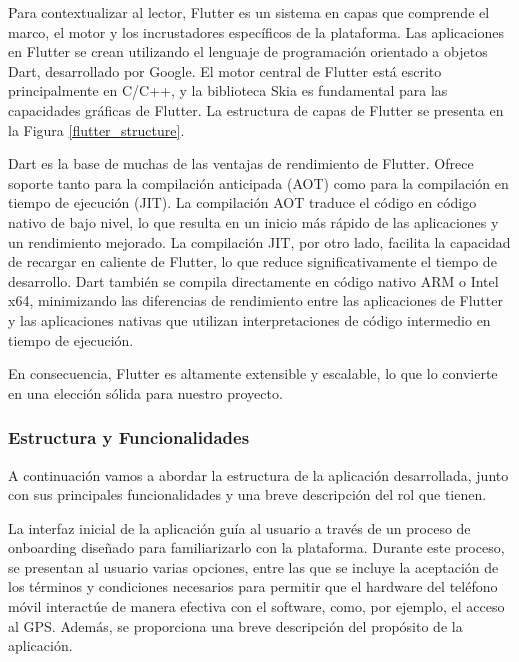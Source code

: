 Para contextualizar al lector, Flutter es un sistema en capas que comprende el marco, el motor y los incrustadores específicos de la plataforma. Las aplicaciones en Flutter se crean utilizando el lenguaje de programación orientado a objetos Dart, desarrollado por Google. El motor central de Flutter está escrito principalmente en C/C++, y la biblioteca Skia es fundamental para las capacidades gráficas de Flutter. La estructura de capas de Flutter se presenta en la Figura \ref{flutter_structure}.


Dart es la base de muchas de las ventajas de rendimiento de Flutter. Ofrece soporte tanto para la compilación anticipada (AOT) como para la compilación en tiempo de ejecución (JIT). La compilación AOT traduce el código en código nativo de bajo nivel, lo que resulta en un inicio más rápido de las aplicaciones y un rendimiento mejorado. La compilación JIT, por otro lado, facilita la capacidad de recargar en caliente de Flutter, lo que reduce significativamente el tiempo de desarrollo. Dart también se compila directamente en código nativo ARM o Intel x64, minimizando las diferencias de rendimiento entre las aplicaciones de Flutter y las aplicaciones nativas que utilizan interpretaciones de código intermedio en tiempo de ejecución.

En consecuencia, Flutter es altamente extensible y escalable, lo que lo convierte en una elección sólida para nuestro proyecto.

\subsubsection{Estructura y Funcionalidades}
A continuación vamos a abordar la estructura de la aplicación desarrollada, junto con sus principales funcionalidades y una breve descripción del rol que tienen.

La interfaz inicial de la aplicación guía al usuario a través de un proceso de onboarding diseñado para familiarizarlo con la plataforma. Durante este proceso, se presentan al usuario varias opciones, entre las que se incluye la aceptación de los términos y condiciones necesarios para permitir que el hardware del teléfono móvil interactúe de manera efectiva con el software, como, por ejemplo, el acceso al GPS. Además, se proporciona una breve descripción del propósito de la aplicación.

